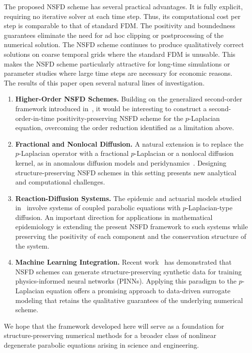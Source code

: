 \documentclass[final,12pt,3p]{elsarticle}
\theoremstyle{plain}
\theoremstyle{definition}
\theoremstyle{remark}
\begin{document}
The proposed NSFD scheme has several practical advantages.
It is fully explicit, requiring no iterative solver at each time step. 
Thus, its computational cost per step is comparable to that of standard FDM.
The positivity and boundedness guarantees eliminate the need for ad hoc clipping or postprocessing of the numerical solution.
The NSFD scheme continues to produce qualitatively correct solutions on coarse temporal grids where the standard FDM is unusable. 
This makes the NSFD scheme particularly attractive for long-time simulations or parameter studies where large time steps are necessary for economic reasons.\\
%
The results of this paper open several natural lines of investigation.
\begin{enumerate}
\item \textbf{Higher-Order NSFD Schemes.} 
Building on the generalized second-order framework introduced in~\cite{hoang2026generalized}, it would be interesting to construct a second-order-in-time positivity-preserving NSFD scheme for the $p$-Laplacian equation, overcoming the order reduction identified as a limitation above.
%
\item \textbf{Fractional and Nonlocal Diffusion.} 
A natural extension is to replace the $p$-Laplacian operator with a fractional $p$-Laplacian or a nonlocal diffusion kernel, as in anomalous diffusion models and peridynamics~\cite{Vazquez2006}.
Designing structure-preserving NSFD schemes in this setting presents new analytical and computational challenges.
%
\item \textbf{Reaction-Diffusion Systems.} 
The epidemic and actuarial models studied in~\cite{Zinihi2026Actuarial, Zinihi2025FDE} involve systems of coupled parabolic equations with $p$-Laplacian-type diffusion.
An important direction for applications in mathematical epidemiology is extending the present NSFD framework to such systems while preserving the positivity of each component and the conservation structure of the system.
%
\item \textbf{Machine Learning Integration.} 
Recent work~\cite{Zinihi2026CA} has demonstrated that NSFD schemes can generate structure-preserving synthetic data for training physics-informed neural networks (PINNs).
Applying this paradigm to the $p$-Laplacian equation offers a promising approach to data-driven surrogate modeling that retains the qualitative guarantees of the underlying numerical scheme.
\end{enumerate}
We hope that the framework developed here will serve as a foundation for structure-preserving numerical methods for a broader class of nonlinear degenerate parabolic equations arising in science and engineering.
\end{document}
